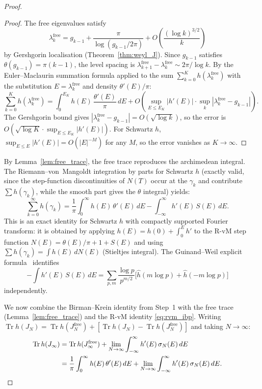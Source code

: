 \documentclass{pre-aomart}
\theoremstyle{plain}
\theoremstyle{definition}
\theoremstyle{remark}
\begin{document}
\begin{proof}
\begin{proof}
The free eigenvalues satisfy
\[
\lambda_k^{\mathrm{free}} = g_{k-1} + \frac{\pi}{\log(g_{k-1}/2\pi)}
+ O\!\left(\frac{(\log k)^{3/2}}{k}\right)
\]
by Gershgorin localisation (Theorem~\ref{thm:weyl_J}).
Since $g_{k-1}$ satisfies $\theta(g_{k-1}) = \pi(k-1)$, the level
spacing is $\lambda_{k+1}^{\mathrm{free}} - \lambda_k^{\mathrm{free}} \sim 2\pi/\log k$.
By the Euler--Maclaurin summation formula applied to the sum
$\sum_{k=0}^K h(\lambda_k^{\mathrm{free}})$ with the substitution
$E = \lambda_k^{\mathrm{free}}$ and density $\theta'(E)/\pi$:
\[
\sum_{k=0}^K h(\lambda_k^{\mathrm{free}})
= \int_0^{E_K} h(E)\,\frac{\theta'(E)}{\pi}\,dE
  + O\!\left(\sup_{E \le E_K}|h'(E)| \cdot \sup_k |\lambda_k^{\mathrm{free}} - g_{k-1}|\right).
\]
The Gershgorin bound gives
$|\lambda_k^{\mathrm{free}} - g_{k-1}| = O(\sqrt{\log k})$,
so the error is $O(\sqrt{\log K}\cdot\sup_{E\le E_K}|h'(E)|)$.
For Schwartz $h$, $\sup_{E\le E}|h'(E)| = O(|E|^{-M})$ for any $M$,
so the error vanishes as $K \to \infty$.
\end{proof}

By Lemma~\ref{lem:free_trace}, the free trace reproduces the archimedean
integral.  The Riemann--von~Mangoldt integration by parts for Schwartz
$h$ (exactly valid, since the step-function discontinuities of $N(T)$
occur at the $\gamma_k$ and contribute $\sum h(\gamma_k)$, while
the smooth part gives the $\theta$ integral) yields:
\begin{equation}\label{eq:rvm_ibp}
\sum_{k=0}^\infty h(\gamma_k)
= \frac{1}{\pi}\int_0^\infty h(E)\,\theta'(E)\,dE
  - \int_{-\infty}^\infty h'(E)\,S(E)\,dE.
\end{equation}
This is an exact identity for Schwartz $h$ with compactly supported
Fourier transform: it is obtained by applying $h(E) = h(0) + \int_0^E h'$
to the R-vM step function $N(E) = \theta(E)/\pi + 1 + S(E)$ and
using $\sum h(\gamma_k) = \int h(E)\,dN(E)$ (Stieltjes integral).
The Guinand--Weil explicit formula~\cite{Weil1952} identifies
\[
-\int h'(E)\,S(E)\,dE
= \sum_{p,m}\frac{\log p}{p^{m/2}}\bigl[\hat{h}(m\log p)+\hat{h}(-m\log p)\bigr]
\]
independently.

We now combine the Birman--Krein identity from Step~1 with the
free trace (Lemma~\ref{lem:free_trace}) and the R-vM identity
\eqref{eq:rvm_ibp}.  Writing
$\operatorname{Tr} h(J_N) = \operatorname{Tr} h(J_N^{\mathrm{free}})
+ [\operatorname{Tr} h(J_N) - \operatorname{Tr} h(J_N^{\mathrm{free}})]$
and taking $N \to \infty$:
\begin{align}
\operatorname{Tr} h(J_\infty)
&= \operatorname{Tr} h(J_\infty^{\mathrm{free}})
   + \lim_{N\to\infty}\int_{-\infty}^{\infty} h'(E)\,\sigma_N(E)\,dE \notag\\
&= \frac{1}{\pi}\int_0^\infty h(E)\,\theta'(E)\,dE
   + \lim_{N\to\infty}\int_{-\infty}^{\infty} h'(E)\,\sigma_N(E)\,dE.
\label{eq:trace_decomp}
\end{align}


\end{proof}
\end{document}
